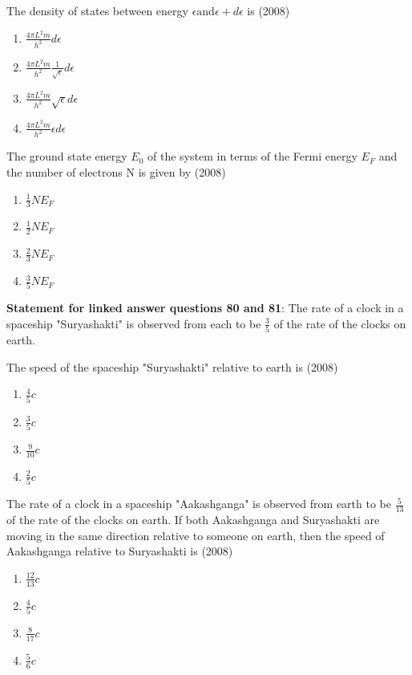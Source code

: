     \item The density of states between energy $\epsilon \text{and} \epsilon+d\epsilon$ is  \hfill (2008)
    \begin{enumerate}[label=(\Alph*)]
        \item $\frac{4\pi L^2 m}{h^2}d\epsilon$
        \item  $\frac{4\pi L^2 m}{h^2}\frac{1}{\sqrt{\epsilon}} d\epsilon$
        \item  $\frac{4\pi L^2 m}{h^2}\sqrt{\epsilon}d\epsilon$
        \item  $\frac{4\pi L^2 m}{h^2}\epsilon d\epsilon$
    \end{enumerate}
    \item  The ground state energy $E_0$ of the system in terms of the Fermi energy $E_F$ and the number of electrons N is given by \hfill (2008)
    \begin{enumerate}[label=(\Alph*)]
        \item $\frac{1}{3}NE_F$
        \item $\frac{1}{2}NE_F$
        \item $\frac{2}{3}NE_F$
        \item $\frac{3}{5}NE_F$
    \end{enumerate}
    \textbf{Statement for linked answer questions 80 and 81}:
    The rate of a clock in a spaceship "Suryashakti" is observed from each to be $\frac{3}{5}$ of the rate of the clocks on earth.
    \item  The speed of the spaceship "Suryashakti" relative to earth is \hfill (2008)
    \begin{enumerate}[label=(\Alph*)]
        \item $\frac{4}{5}c$
        \item $\frac{3}{5}c$
        \item $\frac{9}{10}c$
        \item $\frac{2}{5}c$
    \end{enumerate}
    \item The rate of a clock in a spaceship "Aakashganga" is observed from earth to be $\frac{5}{13}$ of the rate of the clocks on earth. If both Aakashganga and Suryashakti are moving in the same direction relative to someone on earth, then the speed of Aakashganga relative to Suryashakti is \hfill (2008)
    \begin{enumerate}[label=(\Alph*)]
        \item $\frac{12}{13}c$
        \item $\frac{4}{5}c$
        \item $\frac{8}{17}c$
        \item $\frac{5}{6}c$
    \end{enumerate}
